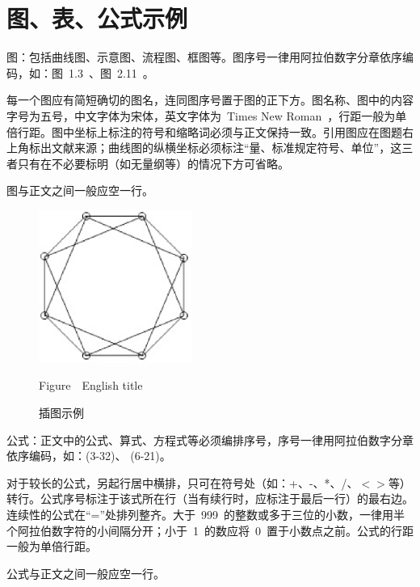 
\chapter{图、表、公式示例}

图：包括曲线图、示意图、流程图、框图等。图序号一律用阿拉伯数字分章依序编码，如：图~1.3~、图~2.11~。

每一个图应有简短确切的图名，连同图序号置于图的正下方。图名称、图中的内容字号为五号，中文字体为宋体，英文字体为~Times New Roman~，行距一般为单倍行距。图中坐标上标注的符号和缩略词必须与正文保持一致。引用图应在图题右上角标出文献来源；曲线图的纵横坐标必须标注“量、标准规定符号、单位”，这三者只有在不必要标明（如无量纲等）的情况下方可省略。

图与正文之间一般应空一行。

\begin{figure}[!h]
  \centering
  \setlength{\abovecaptionskip}{2pt}
  \setlength{\belowcaptionskip}{2pt}
  \includegraphics[height=5cm ,width=5cm]{figures/fig.eps}\\
  \caption{插图示例}
  \label{Figure:4-1}
  Figure\ \thefigure \ English title
\end{figure}

公式：正文中的公式、算式、方程式等必须编排序号，序号一律用阿拉伯数字分章依序编码，如：(3-32)、 (6-21)。

对于较长的公式，另起行居中横排，只可在符号处（如：+、-、*、/、$<$$>$等）转行。公式序号标注于该式所在行（当有续行时，应标注于最后一行）的最右边。连续性的公式在“=”处排列整齐。大于~999~的整数或多于三位的小数，一律用半个阿拉伯数字符的小间隔分开；小于~1~的数应将~0~置于小数点之前。公式的行距一般为单倍行距。

公式与正文之间一般应空一行。

